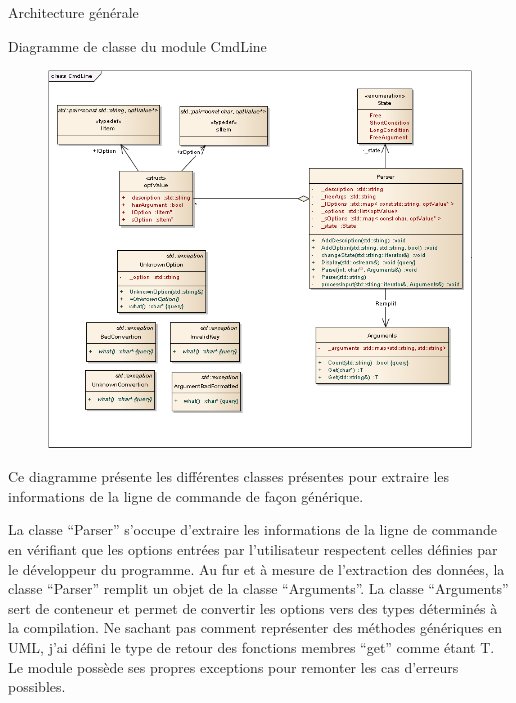 \documentclass{article}
\begin{document}
\newpage
\begin{section}{Architecture générale}

  \begin{subsection}{Diagramme de classe du module CmdLine}
    \begin{figure}[htp]
      \begin{center}
	\includegraphics[scale=0.5]{./diagrammeClasse_cmdLine.png}
      \end{center}
    \end{figure}
    \FloatBarrier
      Ce diagramme présente les différentes classes présentes pour extraire les informations de la ligne de commande de façon générique.
      
      La classe ``Parser'' s'occupe d'extraire les informations de la ligne de commande en vérifiant que les options entrées par l'utilisateur
      respectent celles définies par le développeur du programme. Au fur et à mesure de l'extraction des données, la classe ``Parser'' remplit
      un objet de la classe ``Arguments''. La classe ``Arguments'' sert de conteneur et permet de convertir les options vers des types déterminés
      à la compilation. Ne sachant pas comment représenter des méthodes génériques en UML, j'ai défini le type de retour des fonctions membres
      ``get'' comme étant T. Le module possède ses propres exceptions pour remonter les cas d'erreurs possibles.
   \end{subsection}
   

\end{section}
\end{document}
